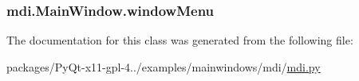 \subsubsection[{window\+Menu}]{\setlength{\rightskip}{0pt plus 5cm}mdi.\+Main\+Window.\+window\+Menu}\label{classmdi_1_1MainWindow_a97b90f2ce511c9408e838a482833f160}


The documentation for this class was generated from the following file\+:\begin{DoxyCompactItemize}
\item 
packages/\+Py\+Qt-\/x11-\/gpl-\/4../examples/mainwindows/mdi/\hyperlink{mdi_8py}{mdi.\+py}\end{DoxyCompactItemize}
